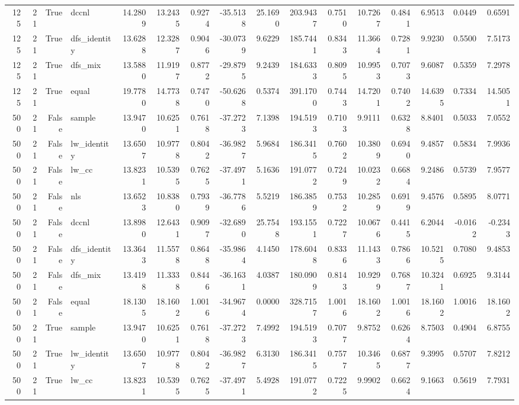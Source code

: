 \begin{tabular}{rrrlrrrrrrrrrrrr}
125 & 21 & True & dccnl & 14.2809 & 13.2435 & 0.9274 & -35.5138 & 25.1690 & 203.9437 & 0.7510 & 10.7267 & 0.4841 & 6.9513 & 0.0449 & 0.6591 \\
125 & 21 & True & dfs_identity & 13.6288 & 12.3287 & 0.9046 & -30.0739 & 9.6229 & 185.7441 & 0.8343 & 11.3664 & 0.7281 & 9.9230 & 0.5500 & 7.5173 \\
125 & 21 & True & dfs_mix & 13.5880 & 11.9197 & 0.8772 & -29.8795 & 9.2439 & 184.6333 & 0.8095 & 10.9953 & 0.7073 & 9.6087 & 0.5359 & 7.2978 \\
125 & 21 & True & equal & 19.7780 & 14.7738 & 0.7470 & -50.6268 & 0.5374 & 391.1700 & 0.7443 & 14.7201 & 0.7402 & 14.6395 & 0.7334 & 14.5051 \\
500 & 21 & False & sample & 13.9470 & 10.6251 & 0.7618 & -37.2723 & 7.1398 & 194.5193 & 0.7103 & 9.9111 & 0.6328 & 8.8401 & 0.5033 & 7.0552 \\
500 & 21 & False & lw_identity & 13.6507 & 10.9778 & 0.8042 & -36.9827 & 5.9684 & 186.3415 & 0.7602 & 10.3809 & 0.6940 & 9.4857 & 0.5834 & 7.9936 \\
500 & 21 & False & lw_cc & 13.8231 & 10.5395 & 0.7625 & -37.4971 & 5.1636 & 191.0772 & 0.7249 & 10.0232 & 0.6684 & 9.2486 & 0.5739 & 7.9577 \\
500 & 21 & False & nls & 13.6523 & 10.8380 & 0.7939 & -36.7786 & 5.5219 & 186.3859 & 0.7532 & 10.2859 & 0.6919 & 9.4576 & 0.5895 & 8.0771 \\
500 & 21 & False & dccnl & 13.8980 & 12.6431 & 0.9097 & -32.6890 & 25.7548 & 193.1551 & 0.7227 & 10.0676 & 0.4415 & 6.2044 & -0.0162 & -0.2343 \\
500 & 21 & False & dfs_identity & 13.3643 & 11.5578 & 0.8648 & -35.9864 & 4.1450 & 178.6048 & 0.8336 & 11.1433 & 0.7866 & 10.5215 & 0.7080 & 9.4853 \\
500 & 21 & False & dfs_mix & 13.4198 & 11.3338 & 0.8446 & -36.1631 & 4.0387 & 180.0909 & 0.8143 & 10.9299 & 0.7687 & 10.3241 & 0.6925 & 9.3144 \\
500 & 21 & False & equal & 18.1305 & 18.1602 & 1.0016 & -34.9674 & 0.0000 & 328.7157 & 1.0016 & 18.1602 & 1.0016 & 18.1602 & 1.0016 & 18.1602 \\
500 & 21 & True & sample & 13.9470 & 10.6251 & 0.7618 & -37.2723 & 7.4992 & 194.5193 & 0.7077 & 9.8752 & 0.6264 & 8.7503 & 0.4904 & 6.8755 \\
500 & 21 & True & lw_identity & 13.6507 & 10.9778 & 0.8042 & -36.9827 & 6.3130 & 186.3415 & 0.7577 & 10.3465 & 0.6877 & 9.3995 & 0.5707 & 7.8212 \\
500 & 21 & True & lw_cc & 13.8231 & 10.5395 & 0.7625 & -37.4971 & 5.4928 & 191.0772 & 0.7225 & 9.9902 & 0.6624 & 9.1663 & 0.5619 & 7.7931 \\

\end{tabular}
